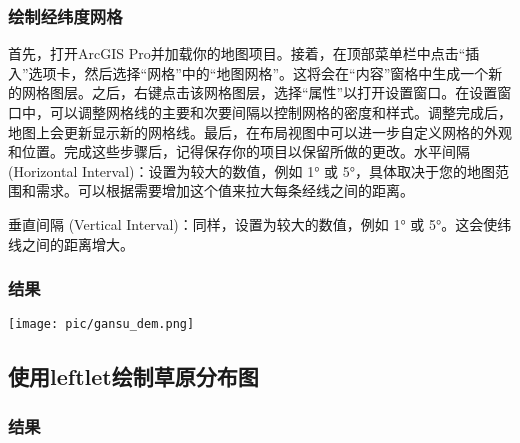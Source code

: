 \documentclass{article}
\begin{document}
\subsubsection{绘制经纬度网格}
首先，打开ArcGIS Pro并加载你的地图项目。接着，在顶部菜单栏中点击“插入”选项卡，然后选择“网格”中的“地图网格”。这将会在“内容”窗格中生成一个新的网格图层。之后，右键点击该网格图层，选择“属性”以打开设置窗口。在设置窗口中，可以调整网格线的主要和次要间隔以控制网格的密度和样式。调整完成后，地图上会更新显示新的网格线。最后，在布局视图中可以进一步自定义网格的外观和位置。完成这些步骤后，记得保存你的项目以保留所做的更改。水平间隔 (Horizontal Interval)：设置为较大的数值，例如 1° 或 5°，具体取决于您的地图范围和需求。可以根据需要增加这个值来拉大每条经线之间的距离。

垂直间隔 (Vertical Interval)：同样，设置为较大的数值，例如 1° 或 5°。这会使纬线之间的距离增大。
				\subsubsection{结果}


			\texttt{[image: pic/gansu\_dem.png]} %
			
			\begin{comment}
						\texttt{[image: pic/xinjiang\_dem.png]} %
								
						\texttt{[image: pic/xizang\_dem.png]} %
						
						
														
						\texttt{[image: pic/sichuan\_dem.png]} %
						
						
												\texttt{[image: pic/neimeng\_dem.png]} %
												
												
																		
												\texttt{[image: pic/qinghai\_dem.png]} %
\end{comment}
	\subsection{使用leftlet绘制草原分布图}
	
	
				\subsubsection{结果}
\end{document}
